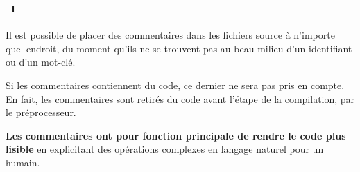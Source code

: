 \begin{frame}
  \frametitle{\secname}
  \framesubtitle{\subsecname~I}

  Il est possible de placer des commentaires dans les fichiers source à n'importe quel endroit, du moment qu'ils ne se trouvent pas au beau milieu d'un identifiant ou d'un mot-clé.
  \par
  Si les commentaires contiennent du code, ce dernier ne sera pas pris en compte. En fait, les commentaires sont retirés du code avant l'étape de la compilation, par le préprocesseur.
  \vspace{0.5cm}
  \par
  \textbf{Les commentaires ont pour fonction principale de rendre le code plus lisible} en explicitant des opérations complexes en langage naturel pour un humain. 
\end{frame}

